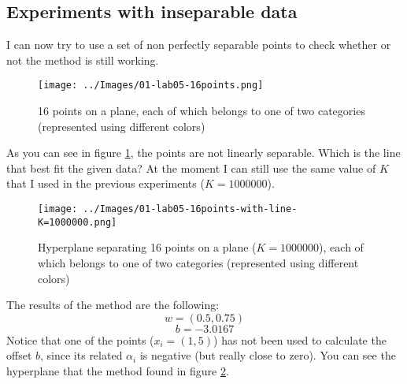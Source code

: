     \subsection{Experiments with inseparable data}
        I can now try to use a set of non perfectly separable points to check whether or not the method is still working.
        \begin{figure}
            \centering
            \texttt{[image: ../Images/01-lab05-16points.png]}
            \caption{16 points on a plane, each of which belongs to one of two categories (represented using different colors)}
            \label{01-lab05-16points}
        \end{figure}
        As you can see in figure \ref{01-lab05-16points}, the points are not linearly separable. Which is the line that best fit the given data? At the moment I can still use the same value of \(K\) that I used in the previous experiments (\(K=1000000\)).
        \begin{figure}
            \centering
            \texttt{[image: ../Images/01-lab05-16points-with-line-K=1000000.png]}
            \caption{Hyperplane separating 16 points on a plane (\(K=1000000\)), each of which belongs to one of two categories (represented using different colors)}
            \label{01-lab05-16points-with-line-K=1000000}
        \end{figure}
        The results of the method are the following:
        \[w = (0.5,0.75)\]
        \[b = -3.0167\]
        Notice that one of the points (\(x_i = (1,5)\)) has not been used to calculate the offset \(b\), since its related \(\alpha_i\) is negative (but really close to zero). You can see the hyperplane that the method found in figure \ref{01-lab05-16points-with-line-K=1000000}.\par

